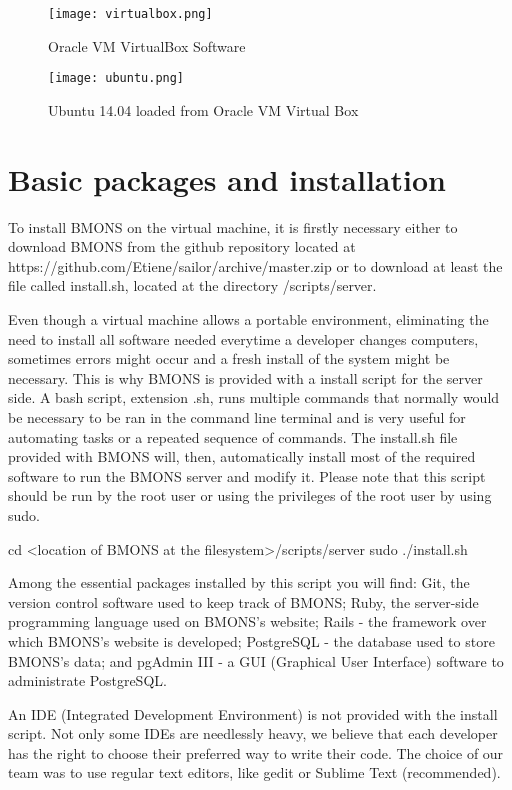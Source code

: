 \clearpage
\begin{figure}[h]
\centering\texttt{[image: virtualbox.png]}
\caption{\label{fig:virtualbox} Oracle VM VirtualBox Software}
\end{figure}

\begin{figure}[h]
\centering\texttt{[image: ubuntu.png]}
\caption{\label{fig:ubuntu} Ubuntu 14.04 loaded from Oracle VM Virtual Box}
\end{figure}

\clearpage

\section{Basic packages and installation}

To install BMONS on the virtual machine, it is firstly necessary either to download BMONS from the github repository located at https://github.com/Etiene/sailor/archive/master.zip or to download at least the file called install.sh, located at the directory /scripts/server.

Even though a virtual machine allows a portable environment, eliminating the need to install all software needed everytime a developer changes computers, sometimes errors might occur and a fresh install of the system might be necessary. This is why BMONS is provided with a install script for the server side. A bash script, extension .sh, runs multiple commands that normally would be necessary to be ran in the command line terminal and is very useful for automating tasks or a repeated sequence of commands. The install.sh file provided with BMONS will, then, automatically install most of the required software to run the BMONS server and modify it. Please note that this script should be run by the root user or using the privileges of the root user by using sudo.

\indent cd <location of BMONS at the filesystem>/scripts/server
\indent sudo ./install.sh

Among the essential packages installed by this script you will find: Git, the version control software used to keep track of BMONS; Ruby, the server-side programming language used on BMONS's website; Rails - the framework over which BMONS's website is developed; PostgreSQL - the database used to store BMONS's data; and pgAdmin III - a GUI (Graphical User Interface) software to administrate PostgreSQL.

An IDE (Integrated Development Environment) is not provided with the install script. Not only some IDEs are needlessly heavy, we believe that each developer has the right to choose their preferred way to write their code. The choice of our team was to use regular text editors, like gedit or Sublime Text (recommended).

